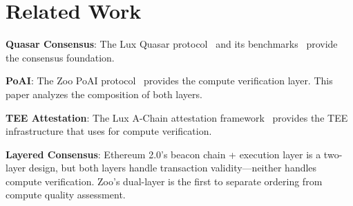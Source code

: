 \section{Related Work}


\textbf{Quasar Consensus}: The Lux Quasar protocol~\cite{lux-quasar-consensus} and its benchmarks~\cite{lux-quasar-benchmarks} provide the consensus foundation.

\textbf{PoAI}: The Zoo PoAI protocol~\cite{zoo-poai-consensus} provides the compute verification layer. This paper analyzes the composition of both layers.

\textbf{TEE Attestation}: The Lux A-Chain attestation framework~\cite{lux-achain-attestation} provides the TEE infrastructure that \PoAI{} uses for compute verification.

\textbf{Layered Consensus}: Ethereum 2.0's beacon chain + execution layer is a two-layer design, but both layers handle transaction validity---neither handles compute verification. Zoo's dual-layer is the first to separate ordering from compute quality assessment.

